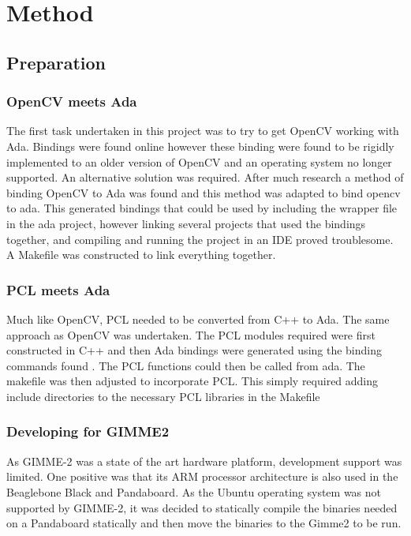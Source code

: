 \section{Method}\label{sec:method}
\subsection{Preparation}
\subsubsection{OpenCV meets Ada}
The first task undertaken in this project was to try to get OpenCV working with Ada. Bindings were found online \cite{oldAdaBindings} however these binding were found to be rigidly implemented to an older version of OpenCV and an operating system no longer supported. An alternative solution was required. After much research a method of binding OpenCV to Ada was found \cite{web:newAdaBindings} and this method was adapted to bind opencv to ada. This generated bindings that could be used by including the wrapper file in the ada project, however linking several projects that used the bindings together, and compiling and running the project in an IDE proved troublesome. A Makefile was constructed to link everything together.

\subsubsection{PCL meets Ada}
Much like OpenCV, PCL needed to be converted from C++ to Ada. The same approach as OpenCV was undertaken. The PCL modules required were first constructed in C++ and then Ada bindings were generated using the binding commands found \cite{web:newAdaBindings}. The PCL functions could then be called from ada. The makefile was then adjusted to incorporate PCL. This simply required adding include directories to the necessary PCL libraries in the Makefile 

\subsubsection{Developing for GIMME2}
As GIMME-2 was a state of the art hardware platform, development support was limited. One positive was that its ARM processor architecture is also used in the Beaglebone Black and Pandaboard. As the Ubuntu operating system was not supported by GIMME-2, it was decided to statically compile the binaries needed on a Pandaboard statically and then move the binaries to the Gimme2 to be run.

